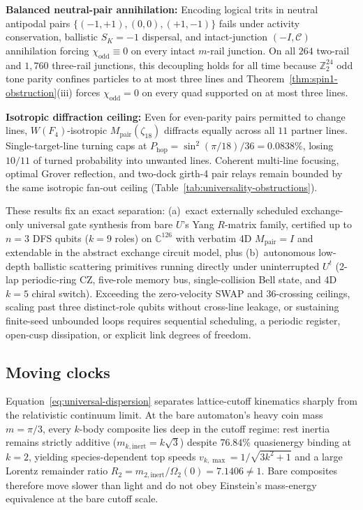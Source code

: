 \textbf{Balanced neutral-pair annihilation:} Encoding logical trits in neutral antipodal pairs
$\{(-1,+1), (0,0), (+1,-1)\}$ fails under activity conservation, ballistic $S_K = -1$ dispersal, and intact-junction
$(-I, \mathcal{C})$ annihilation forcing $\chi_{\mathrm{odd}} \equiv 0$ on every intact $m$-rail junction. On all $264$
two-rail and $1{,}760$ three-rail junctions, this decoupling holds for all time because $\mathbb{Z}_2^{24}$ odd tone
parity confines particles to at most three lines and Theorem~\ref{thm:spin1-obstruction}(iii) forces
$\chi_{\mathrm{odd}} = 0$ on every quad supported on at most three lines.

\textbf{Isotropic diffraction ceiling:} Even for even-parity pairs permitted to change lines, $W(F_4)$-isotropic
$M_{\mathrm{pair}}(\zeta_{18})$ diffracts equally across all $11$ partner lines. Single-target-line turning caps at
$P_{\mathrm{hop}} = \sin^2(\pi/18)/36 = 0.0838\%$, losing $10/11$ of turned probability into unwanted lines. Coherent
multi-line focusing, optimal Grover reflection, and two-dock girth-4 pair relays remain bounded by the same isotropic
fan-out ceiling (Table~\ref{tab:universality-obstructions}).

These results fix an exact separation: (a)~exact externally scheduled exchange-only universal gate synthesis from bare
$U$'s Yang $R$-matrix family, certified up to $n = 3$ DFS qubits ($k = 9$ roles) on $\mathbb{C}^{126}$ with verbatim 4D
$M_{\mathrm{pair}} = I$ and extendable in the abstract exchange circuit model, plus (b)~autonomous low-depth ballistic
scattering primitives running directly under uninterrupted $U^t$ (2-lap periodic-ring CZ, five-role memory bus,
single-collision Bell state, and 4D $k = 5$ chiral switch). Exceeding the zero-velocity SWAP and $36$-crossing ceilings,
scaling past three distinct-role qubits without cross-line leakage, or sustaining finite-seed unbounded loops requires
sequential scheduling, a periodic register, open-cusp dissipation, or explicit link degrees of freedom.

\subsection{Moving clocks}

Equation~\eqref{eq:universal-dispersion} separates lattice-cutoff kinematics sharply from the relativistic continuum
limit. At the bare automaton's heavy coin mass $m = \pi/3$, every $k$-body composite lies deep in the cutoff regime:
rest inertia remains strictly additive ($m_{k,\mathrm{inert}} = k\sqrt{3}$) despite $76.84\%$ quasienergy binding at
$k = 2$, yielding species-dependent top speeds $v_{k,\max} = 1/\sqrt{3k^2+1}$ and a large Lorentz remainder ratio
$R_2 = m_{2,\mathrm{inert}} / \Omega_2(0) = 7.1406 \neq 1$. Bare composites therefore move slower than light and do not
obey Einstein's mass-energy equivalence at the bare cutoff scale.

